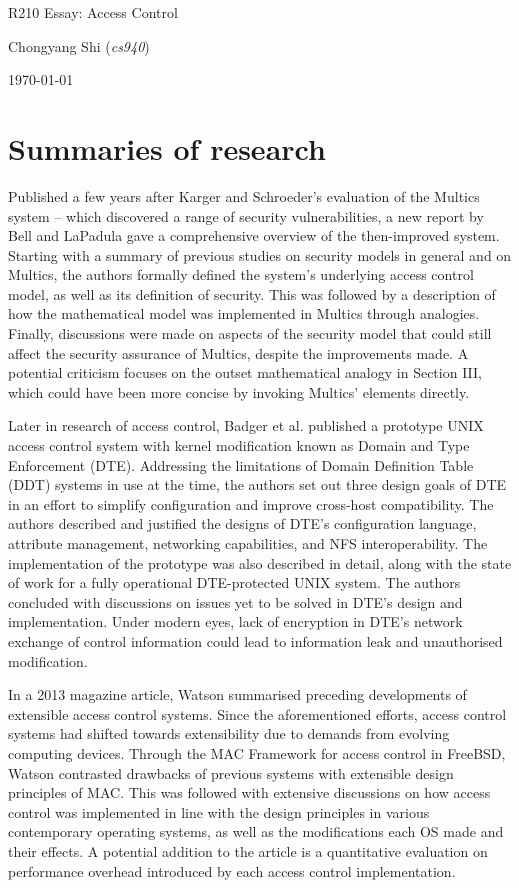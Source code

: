 \documentclass[11pt]{article}
\begin{document}
\centerline{\Large R210 Essay:  Access Control}
\vspace{2em}
\centerline{\large Chongyang Shi (\emph{cs940})}
\vspace{1em}
\centerline{\large \today}
\vspace{1em}

\section{Summaries of research}

Published a few years after Karger and Schroeder's evaluation \cite{karger1974multics} of the Multics system -- which discovered a range of security vulnerabilities, a new report by Bell and LaPadula \cite{bell1976secure} gave a comprehensive overview of the then-improved system. Starting with a summary of previous studies on security models in general and on Multics, the authors  formally defined the system's underlying access control model, as well as its definition of security. This was followed by a description of how the mathematical model was implemented in Multics through analogies. Finally, discussions were made on aspects of the security model that could still affect the security assurance of Multics, despite the improvements made. A potential criticism focuses on the outset mathematical analogy in Section III, which could have been more concise by invoking Multics' elements directly.

Later in research of access control, Badger et al. \cite{badger1996domain} published a prototype UNIX access control system with kernel modification known as Domain and Type Enforcement (DTE). Addressing the limitations of Domain Definition Table (DDT) systems in use at the time, the authors set out three design goals of DTE in an effort to simplify configuration and improve cross-host compatibility. The authors described and justified the designs of DTE's configuration language, attribute management, networking capabilities, and NFS interoperability. The implementation of the prototype was also described in detail, along with the state of work for a fully operational DTE-protected UNIX system. The authors concluded with discussions on issues yet to be solved in DTE's design and implementation. Under modern eyes, lack of encryption in DTE's network exchange of control information could lead to information leak and unauthorised modification.

In a 2013 magazine article, Watson \cite{watson2013decade} summarised preceding developments of extensible access control systems. Since the aforementioned efforts, access control systems had shifted towards extensibility due to demands from evolving computing devices. Through the MAC Framework for access control in FreeBSD, Watson contrasted drawbacks of previous systems with extensible design principles of MAC. This was followed with extensive discussions on how access control was implemented in line with the design principles in various contemporary operating systems, as well as the modifications each OS made and their effects. A potential addition to the article is a quantitative evaluation on performance overhead introduced by each access control implementation.
\end{document}
